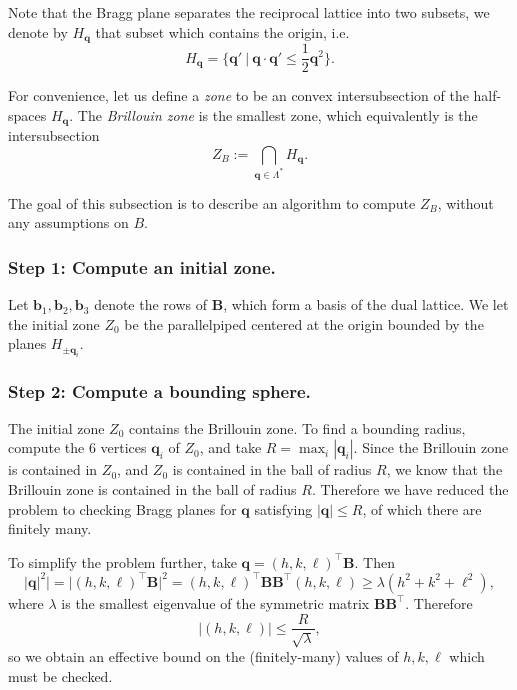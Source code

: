 \documentclass[11pt,a4paper]{article}
\def\v#1{\bm{{#1}}}
\def\tr{^\intercal}
\def\q{{\v{q}}}
\begin{document}
Note that the Bragg plane separates the reciprocal lattice into two subsets, we denote by $H_\q$ that subset
which contains the origin, i.e.
\begin{equation} H_\q = \{ \q' \ | \ \q \cdot \q' \leq \frac{1}{2} \q^2 \}. \end{equation}


For convenience, let us define a \emph{zone} to be an convex intersubsection of the half-spaces $H_\q$.
The \emph{Brillouin zone} is the smallest zone, which equivalently is the intersubsection
\begin{equation} Z_B :=\bigcap_{\q \in \Lambda^\ast} H_\q. \end{equation}

The goal of this subsection is to describe an algorithm to compute $Z_B$, without any assumptions on $B$.

\subsubsection{Step 1: Compute an initial zone.}

Let $\v{b}_1, \v{b}_2, \v{b}_3$ denote the rows of $\v{B}$,
which form a basis of the dual lattice.
We let the initial zone $Z_0$ be the parallelpiped centered at the origin bounded by the planes
$H_{\pm \q_i}$.

\subsubsection{Step 2: Compute a bounding sphere.}

The initial zone $Z_0$ contains the Brillouin zone. To find a bounding radius,
compute the 6 vertices $\q_i$ of $Z_0$,
and take $R = \max_i |\q_i|$. Since the Brillouin zone is contained in $Z_0$,
and $Z_0$ is contained in the ball of radius $R$,
we know that the Brillouin zone is contained in the ball of radius $R$.
Therefore we have reduced the problem to checking
Bragg planes for $\q$ satisfying $|\q| \leq R$, of which there are finitely many.

To simplify the problem further, take $\q = (h,k,\ell)\tr \v{B}$. Then
\begin{equation}
   |\q|^2|
   = |(h,k,\ell)\tr \v{B}|^2
   = (h,k,\ell)\tr \v{B} \v{B}\tr (h,k,\ell)
   \geq \lambda (h^2 + k^2 + \ell^2),
\end{equation}
where $\lambda$ is the smallest eigenvalue of the symmetric matrix $\v{B} \v{B}\tr$. Therefore
\begin{equation} |(h,k,\ell)| \leq \frac{R}{\sqrt\lambda}, \end{equation}
so we obtain an effective bound on the (finitely-many) values of $h,k,\ell$ which must be checked.
\end{document}
